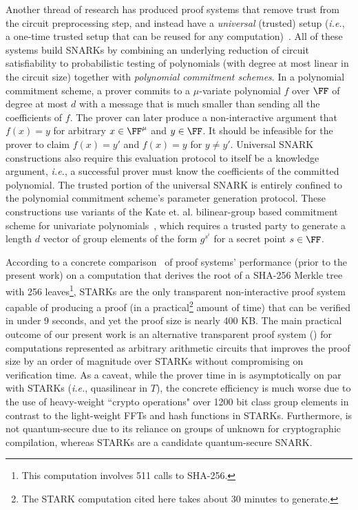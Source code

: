 Another thread of research has produced proof systems that remove trust from the circuit preprocessing step, and instead have a \emph{universal} (trusted) setup (\emph{i.e.}, a one-time trusted setup that can be reused for any computation)~\cite{Sonic,Libra,Spartan,Plonk}. All of these systems build SNARKs by combining an underlying reduction of circuit satisfiability to probabilistic testing of polynomials (with degree at most linear in the circuit size) together with \emph{polynomial commitment schemes}. In a polynomial commitment scheme, a prover commits to a $\mu$-variate polynomial $f$ over $\FF$ of degree at most $d$ with a message that is much smaller than sending all the coefficients of $f$. The prover can later produce a non-interactive argument that $f(x) = y$ for arbitrary $x \in \FF^\mu$ and $y \in \FF$. It should be infeasible for the prover to claim $f(x) = y'$ and $f(x) = y$ for $y \neq y'$. Universal SNARK constructions also require this evaluation protocol to itself be a knowledge argument, \emph{i.e.}, a successful prover must know the coefficients of the committed polynomial. The trusted portion of the universal SNARK is entirely confined to the polynomial commitment scheme's parameter generation protocol. These constructions use variants of the Kate et. al. bilinear-group based commitment scheme for univariate polynomials~\cite{AC:KatZavGol10}, which requires a trusted party to generate a length $d$ vector of group elements of the form $g^{s^i}$ for a secret point $s \in \FF$. 

According to a concrete comparison~\cite{Libra} of proof systems' performance (prior to the present work) on a computation that derives the root of a SHA-256 Merkle tree with 256 leaves\footnote{This computation involves 511 calls to SHA-256.}, STARKs are the only transparent non-interactive proof system capable of producing a proof (in a practical\footnote{The STARK computation cited here takes about 30 minutes to generate.}  amount of time) that can be verified in under 9 seconds, and yet the proof size is nearly 400 KB. The main practical outcome of our present work is an alternative transparent proof system () for computations represented as arbitrary arithmetic circuits that improves the proof size by an order of magnitude over STARKs without compromising on verification time. As a caveat, while the prover time in  is asymptotically on par with STARKs (\emph{i.e.}, quasilinear in $T$), the concrete efficiency is much worse due to the use of heavy-weight ``crypto operations" over 1200 bit class group elements in contrast to the light-weight FFTs and hash functions in STARKs. Furthermore,  is not quantum-secure due to its reliance on groups of unknown for cryptographic compilation, whereas STARKs are a candidate quantum-secure SNARK. 

